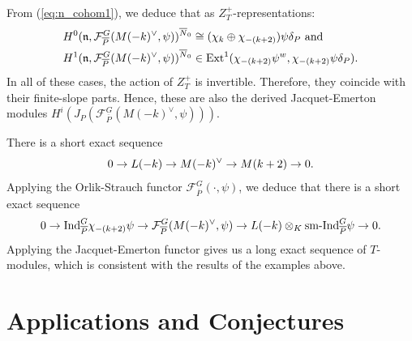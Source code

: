 \documentclass[10pt]{amsart}
\begin{document}
\begin{example}
From (\ref{eq:n_cohom1}), we deduce that as $Z_{T}^{+}$-representations: \begin{align}\begin{split}
    H^{0}(\mathfrak{n},\mathcal{F}_{\overline{P}}^{G}(M(-k)^{\vee},\psi))^{\overline{N}_{0}} & \cong 
    (\chi_{k}\oplus\chi_{-(k+2)}) \psi\delta_{P} \textnormal{ and} \\
    H^{1}(\mathfrak{n},\mathcal{F}_{\overline{P}}^{G}(M(-k)^{\vee},\psi))^{\overline{N}_{0}} &\in \textnormal{Ext}^{1}(\chi_{-(k+2)}\psi^{w},\chi_{-(k+2)} \psi\delta_{P}).  
\end{split}\end{align} In all of these cases, the action of $Z_{T}^{+}$ is invertible. Therefore, they coincide with their finite-slope parts. Hence, these are also the derived Jacquet-Emerton modules $H^{i}(J_{P}(\mathcal{F}_{\overline{P}}^{G}(M(-k)^{\vee},\psi)))$. 

\end{example}
\begin{remark}
There is a short exact sequence \[
    0 \rightarrow L(-k) \rightarrow M(-k)^{\vee} \rightarrow M(k+2) \rightarrow 0.
\] Applying the Orlik-Strauch functor $\mathcal{F}_{\overline{P}}^{G}(\cdot,\psi)$, we deduce that there is a short exact sequence \[
    0\rightarrow \textnormal{Ind}_{\overline{P}}^{G}\chi_{-(k+2)}\psi \rightarrow \mathcal{F}_{\overline{P}}^{G}(M(-k)^{\vee},\psi) \rightarrow L(-k)\otimes_{K}\textnormal{sm-Ind}_{\overline{P}}^{G}\psi \rightarrow 0.
\] Applying the Jacquet-Emerton functor gives us a long exact sequence of $T$-modules, which is consistent with the results of the examples above.
\end{remark}




\vspace{3mm}
\section{Applications and Conjectures}\label{sec:applications}
\end{document}

